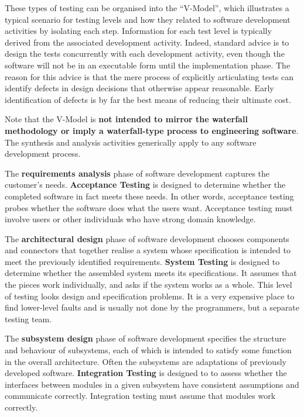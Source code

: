 
These types of testing can be organised into the ``V-Model'', which illustrates
a typical scenario for testing levels and how they related to software
development activities by isolating each step. Information for each test level
is typically derived from the associated development activity. Indeed, standard
advice is to design the tests concurrently with each development activity, even
though the software will not be in an executable form until the implementation
phase. The reason for this advice is that the mere process of explicitly
articulating tests can identify defects in design decisions that otherwise
appear reasonable. Early identification of defects is by far the best means of
reducing their ultimate cost. 


Note that the V-Model is {\bf not intended to mirror the waterfall methodology
or imply a waterfall-type process to engineering software}. The synthesis and
analysis activities generically apply to any software development process.


The {\bf requirements analysis} phase of software development captures the
customer's needs. {\bf Acceptance Testing} is designed to determine whether the
completed software in fact meets these needs. In other words, acceptance testing
probes whether the software does what the users want. Acceptance testing must
involve users or other individuals who have strong domain knowledge.

The {\bf architectural design} phase of software development chooses components
and connectors that together realise a system whose specification is intended to
meet the previously identified requirements. {\bf System Testing} is designed to
determine whether the assembled system meets its specifications. It assumes that
the pieces work individually, and asks if the system works as a whole. This
level of testing looks design and specification problems. It is a very expensive
place to find lower-level faults and is usually not done by the programmers, but
a separate testing team.

The {\bf subsystem design} phase of software development specifies the structure
and behaviour of subsystems, each of which is intended to satisfy some function
in the overall architecture. Often the subsystems are adaptations of previously
developed software. {\bf Integration Testing} is designed to to assess whether
the interfaces between modules in a given subsystem have consistent assumptions
and communicate correctly. Integration testing must assume that modules work
correctly. 

